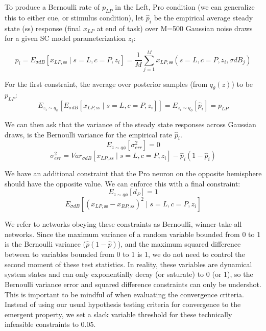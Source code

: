 \documentclass[11pt]{article}
\begin{document}
To produce a Bernoulli rate of $p_{LP}$ in the Left, Pro condition (we can generalize this to either cue, or stimulus condition), let $\hat{p}_i$ be the empirical average steady state (ss) response (final $x_{LP}$ at end of task) over M=500 Gaussian noise draws for a given SC model parameterization $z_i$:

\begin{equation}
 \hat{p}_i = E_{\sigma dB} \left[ x_{LP,\text{ss}} \mid s=L, c=P, z_i \right] = \frac{1}{M}\sum_{j=1}^M x_{LP,\text{ss}}(s=L, c=P, z_i, \sigma dB_j)
 \end{equation}

For the first constraint, the average over posterior samples (from $q_\theta(z)$) to be $p_{LP}$:
\begin{equation}
E_{z_i \sim q_\phi} \left[ E_{\sigma dB} \left[ x_{LP,\text{ss}} \mid s=L, c=P, z_i \right] \right] = E_{z_i \sim q_\phi} \left[ \hat{p}_i \right] = p_{LP}
\end{equation}

We can then ask that the variance of the steady state responses across Gaussian draws, is the Bernoulli variance for the empirical rate $\hat{p}_i$.
\begin{equation}
E_{z \sim q\phi} \left[ \sigma^2_{err} \right] = 0
\end{equation}
\begin{equation}
\sigma^2_{err} = Var_{\sigma dB} \left[ x_{LP,\text{ss}} \mid s=L, c=P, z_i \right] - \hat{p}_i(1 - \hat{p}_i)
\end{equation}

We have an additional constraint that the Pro neuron on the opposite hemisphere should have the opposite value.  We can enforce this with a final constraint:
\begin{equation}
E_{z \sim q\phi} \left[ d_P \right] = 1
\end{equation}
\begin{equation}
E_{\sigma dB} \left[ (x_{LP,\text{ss}} - x_{RP,\text{ss}})^2  \mid s=L, c=P, z_i \right]
\end{equation}

We refer to networks obeying these constraints as Bernoulli, winner-take-all networks.  Since the maximum variance of a random variable bounded from 0 to 1 is the Bernoulli variance ($\hat{p}(1-\hat{p})$), and the maximum squared difference between to variables bounded from 0 to 1 is 1, we do not need to control the second moment of these test statistics.  In reality, these variables are dynamical system states and can only exponentially decay (or saturate) to 0 (or 1), so the Bernoulli variance error and squared difference constraints can only be undershot.  This is important to be mindful of when evaluating the convergence criteria.  Instead of using our usual hypothesis testing criteria for convergence to the emergent property, we set a slack variable threshold for these technically infeasible constraints to 0.05.
\end{document}
